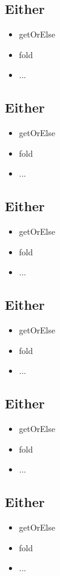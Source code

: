 \documentclass[10pt,landscape,a4paper]{article}
\begin{document}
\begin{multicols*}{4}
\subsection{Either}
\begin{itemize}
\item getOrElse
\item fold
\item ...
\end{itemize}
\subsection{Either}
\begin{itemize}
\item getOrElse
\item fold
\item ...
\end{itemize}
\subsection{Either}
\begin{itemize}
\item getOrElse
\item fold
\item ...
\end{itemize}
\subsection{Either}
\begin{itemize}
\item getOrElse
\item fold
\item ...
\end{itemize}
\subsection{Either}
\begin{itemize}
\item getOrElse
\item fold
\item ...
\end{itemize}
\subsection{Either}
\begin{itemize}
\item getOrElse
\item fold
\item ...
\end{itemize}

\end{multicols*}
\end{document}
